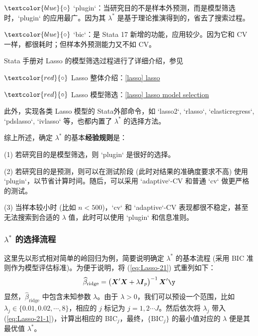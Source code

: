 $\textcolor{blue}{\circ}$ `plugin`：当研究目的不是样本外预测，而是模型筛选时，`plugin` 的应用最广。因为其 $\lambda^*$ 是基于理论推演得到的，省去了搜索过程。

$\textcolor{blue}{\circ}$ `bic`：是 Stata 17 新增的功能，应用较少。因为它和 CV 一样，都很耗时；但样本外预测能力又不如 CV。

Stata 手册对 Lasso 的模型筛选过程进行了详细介绍，参见 

$\textcolor{red}{\circ}$ Lasso 整体介绍：\href{https://www.stata.com/manuals/lassolasso.pdf}{[lasso] lasso}

$\textcolor{red}{\circ}$ Lasso 模型筛选：\href{https://www.stata.com/manuals/lassolasso.pdf}{[lasso] lasso model selection}

此外，实现各类 Lasso 模型的 Stata外部命令，如 `lasso2`, `rlasso`, `elasticregress`, `pdslasso`, `ivlasso` 等，也都内置了 $\lambda^*$ 的选择方法。 

\vspace{5pt}
综上所述，确定 $\lambda^{*}$ 的基本\textbf{经验规则}是：
\vspace{5pt}

(1) 若研究目的是模型筛选，则 `plugin` 是很好的选择。

(2) 若研究目的是预测，则可以在测试阶段 (此时对结果的准确度要求不高) 使用 `plugin`，以节省计算时间。随后，可以采用 `adaptive`-CV 和普通 `cv` 做更严格的测试。

(3) 当样本较小时 (比如 $n<500$)，`cv` 和 `adaptive`-CV 表现都很不稳定，甚至无法搜索到合适的 $\lambda$ 值，此时可以使用 `plugin` 和信息准则。

\subsubsection{$\lambda^*$ 的选择流程}

这里先以形式相对简单的岭回归为例，简要说明确定  $\lambda^*$ 的基本流程 (采用 BIC 准则作为模型评估标准)。为便于说明，将
(\ref{eq:Lasso-21}) 式重列如下：
\begin{equation}\label{eq:Lasso-21-1}
	\widehat{\beta}_{\text {ridge}} =\left(\boldsymbol{X}^{\prime} \boldsymbol{X}+\lambda \boldsymbol{I}_{p}\right)^{-1} \boldsymbol{X}^{\prime} \boldsymbol{\y}
\end{equation}
显然，$\widehat{\beta}_{\text {ridge}}$ 中包含未知参数 $\lambda$。由于 $\lambda>0$，我们可以预设一个范围，比如 $\lambda_j \in \{0.01, 0.02, \cdots, 8\}$，相应的 $j$ 标记为 $j=1,2\cdots J$。然后依次将 $\lambda_j$ 带入 (\ref{eq:Lasso-21-1})，计算出相应的 BIC$_j$，最终，$\{\mathrm{BIC}_j\}$ 的最小值对应的 $\lambda$ 便是其最优值 $\lambda^*$。

